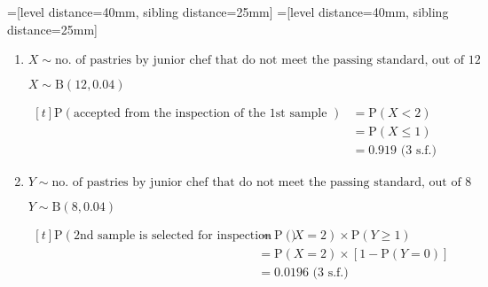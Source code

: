 \documentclass[11pt,a4paper]{book}
\begin{document}
\begin{example}
\begin{enumerate}[label=(\alph*)]
\end{enumerate}

\Solution

\begin{center}
=[level distance=40mm, sibling distance=25mm]
=[level distance=40mm, sibling distance=25mm]
\end{center}

\begin{enumerate}[label=(\alph*)]


\item  $X\sim\text{no. of pastries by junior chef that do not meet the passing standard, out of 12}$

$X\sim\text{B}\left(12,0.04\right)$

$
\begin{aligned}[t]
\text{P}\left(\text{accepted from the inspection of the 1st sample }\right) & =\text{P}\left(X<2\right)\\
 & =\text{P}\left(X\leq1\right)\\
 & =0.919\text{ (3 s.f.)}
\end{aligned}
$

\item  $Y\sim\text{no. of pastries by junior chef that do not meet the passing standard, out of 8}$

$Y\sim\text{B}\left(8,0.04\right)$

$
\begin{aligned}[t]
\text{P}\left(\text{2nd sample is selected for inspection and rejected}\right) & =\text{P}\left(X=2\right)\times\text{P}\left(Y\geq1\right)\\
 & =\text{P}\left(X=2\right)\times\left[1-\text{P}\left(Y=0\right)\right]\\
 & =0.0196\text{ (3 s.f.)}
\end{aligned}
$



\end{enumerate}
\end{example}
\end{document}
